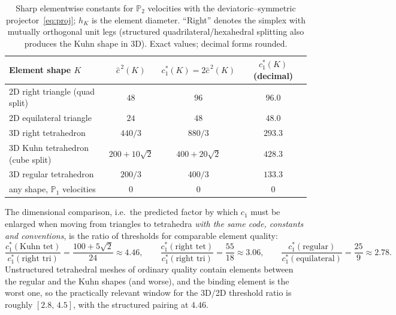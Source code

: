 \documentclass[11pt,a4paper]{article}
\theoremstyle{remark}
\newcommand{\PP}{\mathbb{P}}
\newcommand{\chat}{\hat{c}}
\begin{document}
\begin{table}[ht]
\centering
\caption{Sharp elementwise constants for $\PP_2$ velocities with the
deviatoric--symmetric projector~\eqref{eq:proj}; $h_K$ is the element
diameter. ``Right'' denotes the simplex with mutually orthogonal unit
legs (structured quadrilateral/hexahedral splitting also produces the
Kuhn shape in 3D). Exact values; decimal forms rounded.}
\label{tab:constants}
\begin{tabular}{lccc}
\toprule
Element shape $K$ & $\chat^{\,2}(K)$ & $c_1^*(K) = 2\chat^{\,2}(K)$ &
$c_1^*(K)$ (decimal) \\
\midrule
2D right triangle (quad split) & $48$ & $96$ & $96.0$ \\
2D equilateral triangle        & $24$ & $48$ & $48.0$ \\
3D right tetrahedron           & $440/3$ & $880/3$ & $293.3$ \\
3D Kuhn tetrahedron (cube split) & $200+10\sqrt2$ & $400+20\sqrt2$ &
$428.3$ \\
3D regular tetrahedron         & $200/3$ & $400/3$ & $133.3$ \\
\midrule
any shape, $\PP_1$ velocities  & $0$ & $0$ & $0$ \\
\bottomrule
\end{tabular}
\end{table}

The dimensional comparison, i.e.\ the predicted factor by which $c_1$
must be enlarged when moving from triangles to tetrahedra \emph{with
the same code, constants and conventions}, is the ratio of thresholds
for comparable element quality:
%
\begin{equation}
\label{eq:ratios}
\frac{c_1^*(\text{Kuhn tet})}{c_1^*(\text{right tri})}
 = \frac{100+5\sqrt2}{24} \approx 4.46,
\qquad
\frac{c_1^*(\text{right tet})}{c_1^*(\text{right tri})}
 = \frac{55}{18} \approx 3.06,
\qquad
\frac{c_1^*(\text{regular})}{c_1^*(\text{equilateral})}
 = \frac{25}{9} \approx 2.78 .
\end{equation}
%
Unstructured tetrahedral meshes of ordinary quality contain elements
between the regular and the Kuhn shapes (and worse), and the binding
element is the worst one, so the practically relevant window for the
3D/2D threshold ratio is roughly $[2.8,\,4.5]$, with the structured
pairing at $4.46$.
\end{document}
